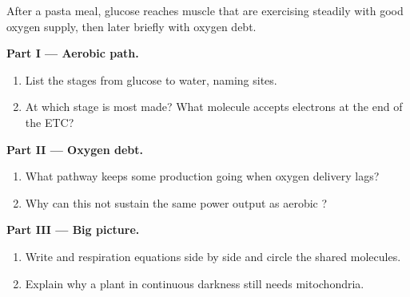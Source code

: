 \begin{problem}
\label{pb:g10:cellular-respiration:1}
After a pasta meal, glucose reaches muscle  that are exercising
steadily with good oxygen supply, then later briefly with oxygen debt.

\medskip
\noindent\textbf{Part I --- Aerobic path.}
\begin{enumerate}
  \item List the stages from glucose to water, naming sites.
  \item At which stage is most  made? What molecule accepts electrons
        at the end of the ETC?
\end{enumerate}

\medskip
\noindent\textbf{Part II --- Oxygen debt.}
\begin{enumerate}
  \item What pathway keeps some  production going when oxygen delivery
        lags?
  \item Why can this not sustain the same power output as aerobic
        ?
\end{enumerate}

\medskip
\noindent\textbf{Part III --- Big picture.}
\begin{enumerate}
  \item Write  and respiration equations side by side and
        circle the shared molecules.
  \item Explain why a plant in continuous darkness still needs
        mitochondria.
\end{enumerate}
\end{problem}
